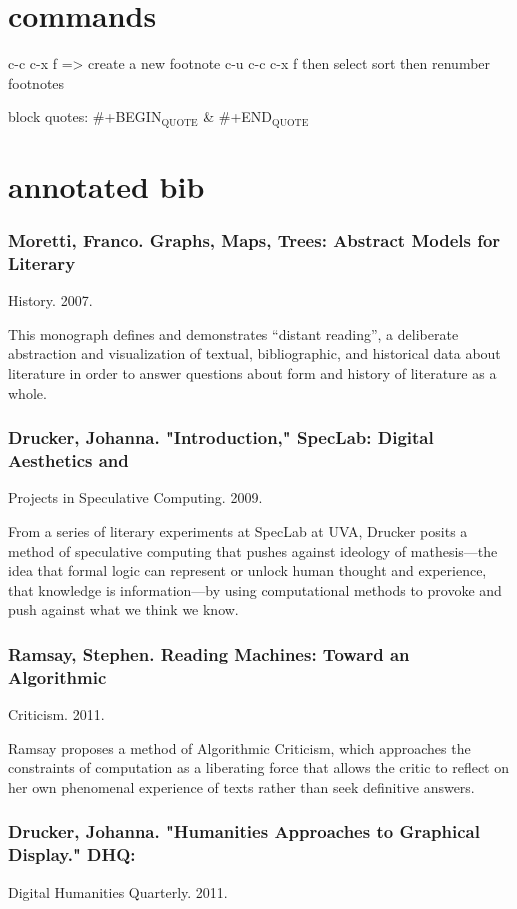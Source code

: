 \documentclass[11pt]{article}
\begin{document}
\section{commands}
\label{sec:orgb5999c9}
c-c c-x f => create a new footnote
c-u c-c c-x f then select sort then renumber footnotes

block quotes: \#+BEGIN\(_{\text{QUOTE}}\) \& \#+END\(_{\text{QUOTE}}\)

\section{annotated bib}
\label{sec:orgc22edb0}
\subsubsection{Moretti, Franco. Graphs, Maps, Trees: Abstract Models for Literary}
\label{sec:orga988bdc}
History. 2007.

This monograph defines and demonstrates “distant reading”, a deliberate abstraction and visualization of textual, bibliographic, and historical data about literature in order to answer questions about form and history of literature as a whole. 

\subsubsection{Drucker, Johanna. "Introduction," SpecLab: Digital Aesthetics and}
\label{sec:orgec79b19}
Projects in Speculative Computing. 2009.

From a series of literary experiments at SpecLab at UVA, Drucker
posits a method of speculative computing that pushes against ideology
of mathesis---the idea that formal logic can represent or unlock human
thought and experience, that knowledge is information---by using
computational methods to provoke and push against what we think we
know.

\subsubsection{Ramsay, Stephen. Reading Machines: Toward an Algorithmic}
\label{sec:org122f101}
Criticism. 2011.

Ramsay proposes a method of Algorithmic Criticism, which approaches
the constraints of computation as a liberating force that allows the
critic to reflect on her own phenomenal experience of texts rather
than seek definitive answers.

\subsubsection{Drucker, Johanna. "Humanities Approaches to Graphical Display." DHQ:}
\label{sec:orgbccb1dd}
Digital Humanities Quarterly. 2011.
\end{document}
